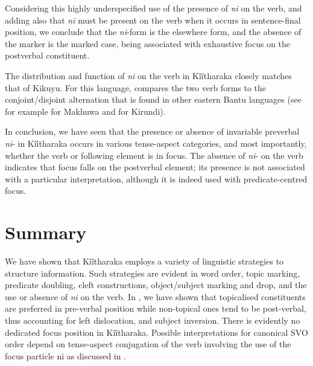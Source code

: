 \documentclass[output=paper]{langscibook}
\begin{document}
\z


Considering this highly underspecified use of the presence of \textit{ni} on the verb, and adding also that \textit{ni} must be present on the verb when it occurs in sentence-final position, we conclude that the \textit{ni}-form is the elsewhere form, and the absence of the marker is the marked case, being associated with exhaustive focus on the postverbal constituent.

The distribution and function of \textit{ni} on the verb in Kîîtharaka closely matches that of Kikuyu. For this language, \citet{Morimoto2017} compares the two verb forms to the conjoint\slash disjoint alternation that is found in other eastern Bantu languages (see for example \textcite{chapters/makhuwa} for Makhuwa and \textcite{chapters/kirundi} for Kirundi).

In conclusion, we have seen that the presence or absence of invariable preverbal \textit{ni}- in Kîîtharaka occurs in various tense-aspect categories, and most importantly, whether the verb or following element is in focus. The absence of \textit{ni}- on the verb indicates that focus falls on the postverbal element; its presence is not associated with a particular interpretation, although it is indeed used with predicate-centred focus.

\section{Summary}

We have shown that Kîîtharaka employs a variety of linguistic strategies to structure information. Such strategies are evident in word order, topic marking, predicate doubling, cleft constructions, object/subject marking and drop, and the use or absence of \textit{ni} on the verb. In , we have shown that topicalised constituents are preferred in pre-verbal position while non-topical ones tend to be post-verbal, thus accounting for left dislocation, and subject inversion. There is evidently no dedicated focus position in Kîîtharaka. Possible interpretations for canonical SVO order depend on tense-aspect conjugation of the verb involving the use of the focus particle ni as discussed in .
\end{document}
